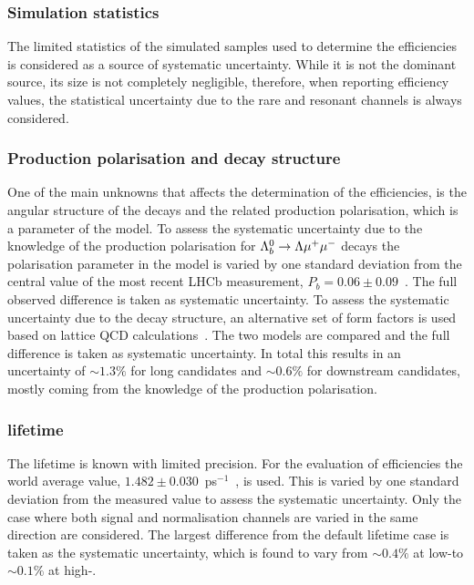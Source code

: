 \subsubsection{Simulation statistics}

The limited statistics of the simulated samples used to determine the efficiencies is considered 
as a source of systematic uncertainty.
While it is not the dominant source, its size is not completely negligible, 
therefore, when reporting efficiency values, the statistical uncertainty due to the  
rare and resonant channels is always considered. 

\subsubsection{Production polarisation and decay structure}
\label{sec:BRpolsys}

One of the main unknowns that affects the determination of the efficiencies, is the angular structure of
the decays and the related production polarisation, which is a parameter of the model.
%
To assess the systematic uncertainty due to the knowledge of the production polarisation for $\Lambda^0_b\rightarrow\Lambda\mu^+\mu^-$ decays
the polarisation parameter in the model is varied by one standard deviation from the central value of the
most recent LHCb measurement, $P_b = 0.06 \pm 0.09$~\cite{Aaij:2013oxa}. The full observed difference is
taken as systematic uncertainty. To assess the systematic uncertainty due to the decay structure,
an alternative set of form factors is used based on lattice QCD calculations~\cite{Detmold:2012vy}. 
The two models are compared and the full difference is taken as systematic uncertainty.
%
In total this results in an uncertainty of \mbox{$\sim1.3\%$} for long candidates and \mbox{$\sim0.6\%$} for downstream
candidates, mostly coming from the knowledge of the production polarisation.

\subsubsection{\Lb lifetime}

The \Lb lifetime is known with limited precision. For the evaluation of efficiencies the
world average value, $1.482\pm0.030$~ps$^{-1}$~\cite{Aaij:2013oha}, is used. This is
varied by one standard deviation from the measured value to assess the systematic uncertainty.
Only the case where both signal and normalisation channels are varied in the same direction are considered.
The largest difference from the default lifetime case is taken as the systematic uncertainty,
which is found to vary from $\sim 0.4\%$ at low-\qsq to $\sim 0.1\%$ at high-\qsq.


